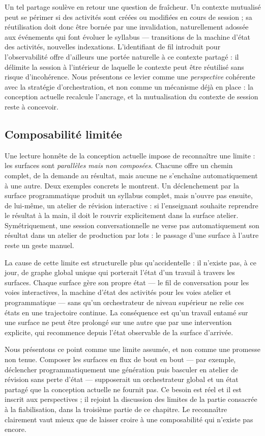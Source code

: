 Un tel partage soulève en retour une question de fraîcheur. Un contexte
mutualisé peut se périmer si des activités sont créées ou modifiées en
cours de session ; sa réutilisation doit donc être bornée par une
invalidation, naturellement adossée aux événements qui font évoluer le
syllabus — transitions de la machine d'état des activités, nouvelles
indexations. L'identifiant de fil introduit pour l'observabilité offre
d'ailleurs une portée naturelle à ce contexte partagé : il délimite la
session à l'intérieur de laquelle le contexte peut être réutilisé sans
risque d'incohérence. Nous présentons ce levier comme une
\emph{perspective} cohérente avec la stratégie d'orchestration, et non
comme un mécanisme déjà en place : la conception actuelle recalcule
l'ancrage, et la mutualisation du contexte de session reste à
concevoir.

\subsection{Composabilité limitée}
\label{sec:composabilite}

Une lecture honnête de la conception actuelle impose de reconnaître
une limite : les surfaces sont \emph{parallèles mais non composées}.
Chacune offre un chemin complet, de la demande au résultat, mais
aucune ne s'enchaîne automatiquement à une autre. Deux exemples
concrets le montrent. Un déclenchement par la surface programmatique
produit un syllabus complet, mais n'ouvre pas ensuite, de lui-même, un
atelier de révision interactive : si l'enseignant souhaite reprendre
le résultat à la main, il doit le rouvrir explicitement dans la
surface atelier. Symétriquement, une session conversationnelle ne
verse pas automatiquement son résultat dans un atelier de production
par lots : le passage d'une surface à l'autre reste un geste manuel.

La cause de cette limite est structurelle plus qu'accidentelle :
il n'existe pas, à ce jour, de graphe global unique qui porterait
l'état d'un travail à travers les surfaces. Chaque surface gère son
propre état — le fil de conversation pour les voies interactives, la
machine d'état des activités pour les voies atelier et programmatique —
sans qu'un orchestrateur de niveau supérieur ne relie ces états en une
trajectoire continue. La conséquence est qu'un travail entamé sur une
surface ne peut être prolongé sur une autre que par une intervention
explicite, qui recommence depuis l'état observable de la surface
d'arrivée.

Nous présentons ce point comme une limite assumée, et non comme une
promesse non tenue. Composer les surfaces en flux de bout en bout —
par exemple, déclencher programmatiquement une génération puis basculer
en atelier de révision sans perte d'état — supposerait un orchestrateur
global et un état partagé que la conception actuelle ne fournit pas. Ce
besoin est réel et il est inscrit aux perspectives ; il rejoint la
discussion des limites de la partie consacrée à la fiabilisation, dans
la troisième partie de ce chapitre. Le reconnaître clairement vaut
mieux que de laisser croire à une composabilité qui n'existe pas
encore.

